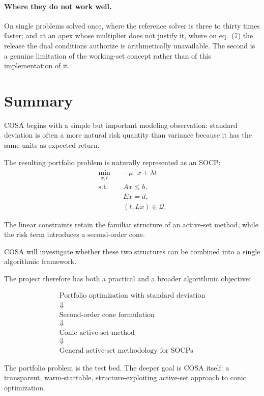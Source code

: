 \documentclass[11pt,a4paper]{article}
\begin{document}
\paragraph{Where they do not work well.} On single problems solved
once, where the reference solver is three to thirty times faster; and
at an apex whose multiplier does not justify it, where on eq.~(7) the
release the dual conditions authorize is arithmetically unavailable.
The second is a genuine limitation of the working-set concept rather
than of this implementation of it.

\section{Summary}

COSA begins with a simple but important modeling observation:
standard deviation is often a more natural risk quantity than
variance because it has the same units as expected return.

The resulting portfolio problem is naturally represented as an SOCP:
\[
\begin{aligned}
\min_{x,t}\quad&
-\mu^\top x+\lambda t\\
\text{s.t.}\quad&
Ax\leq b,\\
&Ex=d,\\
&(t,Lx)\in\mathcal Q.
\end{aligned}
\]

The linear constraints retain the familiar structure of an
active-set method, while the risk term introduces a second-order
cone.

COSA will investigate whether these two structures can be combined
into a single algorithmic framework.

The project therefore has both a practical and a broader algorithmic
objective:

\[
\boxed{
\begin{array}{c}
\text{Portfolio optimization with standard deviation}\\[3pt]
\Downarrow\\[3pt]
\text{Second-order cone formulation}\\[3pt]
\Downarrow\\[3pt]
\text{Conic active-set method}\\[3pt]
\Downarrow\\[3pt]
\text{General active-set methodology for SOCPs}
\end{array}}
\]

The portfolio problem is the test bed. The deeper goal is COSA itself:
a transparent, warm-startable, structure-exploiting active-set
approach to conic optimization.
\end{document}
